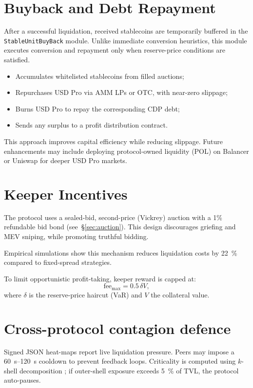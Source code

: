 \documentclass[11pt]{article}
\begin{document}
\section{Buyback and Debt Repayment}
\label{sec:buyback}
After a successful liquidation, received stablecoins are temporarily buffered in the \texttt{StableUnitBuyBack} module.  
Unlike immediate conversion heuristics, this module executes conversion and repayment only when reserve-price conditions are satisfied.

\begin{itemize}
  \item Accumulates whitelisted stablecoins from filled auctions;
  \item Repurchases USD Pro via AMM LPs or OTC, with near-zero slippage;
  \item Burns USD Pro to repay the corresponding CDP debt;
  \item Sends any surplus to a profit distribution contract.
\end{itemize}

This approach improves capital efficiency while reducing slippage.  
Future enhancements may include deploying protocol-owned liquidity (POL) on Balancer or Uniswap for deeper USD Pro markets.


\section{Keeper Incentives}
The protocol uses a sealed-bid, second-price (Vickrey) auction with a 1\% refundable bid bond (see~§\ref{sec:auction}).  
This design discourages griefing and MEV sniping, while promoting truthful bidding.

Empirical simulations \parencite{tian2025defi} show this mechanism reduces liquidation costs by \SI{22}{\percent} compared to fixed-spread strategies.

To limit opportunistic profit-taking, keeper reward is capped at:
\[
\text{fee}_{\max} = 0.5\,\delta V,
\]
where \( \delta \) is the reserve-price haircut (VaR) and \( V \) the collateral value.


\section{Cross-protocol contagion defence}
\label{sec:contagion}
Signed JSON heat-maps report live liquidation pressure.  
Peers may impose a \SIrange{60}{120}{\second} cooldown to prevent feedback loops.  
Criticality is computed using $k$-shell decomposition \parencite{battiston2016debtrank};  
if outer-shell exposure exceeds \SI{5}{\percent} of TVL, the protocol auto-pauses.
\end{document}
